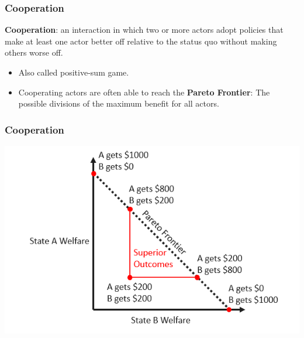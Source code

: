 \documentclass{beamer}
\begin{document}
\begin{frame} 
	\frametitle{\LARGE{Cooperation}}
	\textbf{Cooperation}: an interaction in which two or more actors adopt policies that make at least one actor better off relative to the status quo without making others worse off.
	\begin{itemize}
		\item Also called positive-sum game.
		\item Cooperating actors are often able to reach the \textbf{Pareto Frontier}: The possible divisions of the maximum benefit for all actors.
	\end{itemize}
\end{frame}

\begin{frame} 
	\frametitle{\LARGE{Cooperation}}
	\centering	\includegraphics[width=\textwidth,height=0.8\textheight,keepaspectratio]{cooperation.png}
\end{frame}
\end{document}

